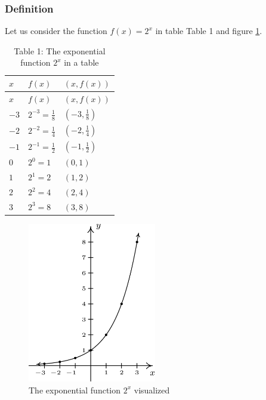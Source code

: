 \documentclass[
  12pt,
  oneside]{book}
\theoremstyle{definition}
\theoremstyle{definition}
\theoremstyle{definition}
\theoremstyle{definition}
\theoremstyle{remark}
\begin{document}
\hypertarget{definition}{%
\subsubsection{Definition}\label{definition}}

Let us consider the function \(f(x) = 2^{x}\) in table Table 1 and figure \ref{fig:IntroExpLogs-1}.

\begin{longtable}[]{@{}lll@{}}
\caption{Table 1: The exponential function \(2^{x}\) in a table}\tabularnewline
\toprule\noalign{}
\(x\) & \(f(x)\) & \((x,f(x))\) \\
\midrule\noalign{}
\endfirsthead
\toprule\noalign{}
\(x\) & \(f(x)\) & \((x,f(x))\) \\
\midrule\noalign{}
\endhead
\bottomrule\noalign{}
\endlastfoot
\(-3\) & \(2^{-3} = \frac{1}{8}\) & \((-3, \frac{1}{8})\) \\
\(-2\) & \(2^{-2} = \frac{1}{4}\) & \((-2, \frac{1}{4})\) \\
\(-1\) & \(2^{-1} = \frac{1}{2}\) & \((-1, \frac{1}{2})\) \\
\(0\) & \(2^{0} = 1\) & \((0 ,1)\) \\
\(1\) & \(2^{1} = 2\) & \((1, 2)\) \\
\(2\) & \(2^{2} = 4\) & \((2,4)\) \\
\(3\) & \(2^{3} = 8\) & \((3, 8)\) \\
\end{longtable}

\begin{figure}
\centering
\includegraphics[width=0.5\textwidth,height=\textheight]{fig/IntroExpLogs-1.png}
\caption{\label{fig:IntroExpLogs-1} The exponential function \(2^{x}\) visualized}
\end{figure}
\end{document}

